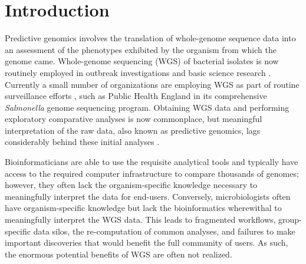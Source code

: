 \documentclass[doublespacing, linenumbers]{bmcart}
\begin{document}



\section*{Introduction}
Predictive genomics involves the translation of whole-genome sequence data into an assessment of the phenotypes exhibited by the organism from which the genome came. Whole-genome sequencing (WGS) of bacterial isolates is now routinely employed in outbreak investigations and basic science research \cite{reuter_pilot_2013,fittipaldi_integrated_2013}. Currently a small number of organizations are employing WGS as part of routine surveillance efforts \cite{zankari_genotyping_2013,cody_real-time_2013}, such as Public Health England in its comprehensive \textit{Salmonella} genome sequencing program. Obtaining WGS data and performing exploratory comparative analyses is now commonplace, but meaningful interpretation of the raw data, also known as predictive genomics, lags considerably behind these initial analyses \cite{sherry_outbreak_2013}.

Bioinformaticians are able to use the requisite analytical tools and typically have access to the required computer infrastructure to compare thousands of genomes; however, they often lack the organism-specific knowledge necessary to meaningfully interpret the data for end-users. Conversely, microbiologists often have organism-specific knowledge but lack the bioinformatics wherewithal to meaningfully interpret the WGS data. This leads to fragmented workflows, group-specific data silos, the re-computation of common analyses, and failures to make important discoveries that would benefit the full community of users. As such, the enormous potential benefits of WGS are often not realized.
\end{document}
